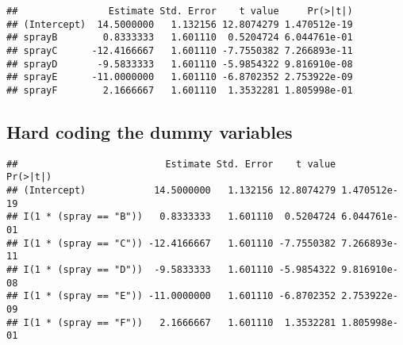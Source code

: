 \documentclass[12pt,openright,oneside,a4paper,chapter=TITLE,section=TITLE,subsection=Title,english,french,spanish,portugues,sumario=tradicional]{04-class-files/abntex2}
\newenvironment{Shaded}{\begin{snugshade}}{\end{snugshade}}
\newcommand{\DataTypeTok}[1]{\textcolor[rgb]{0.13,0.29,0.53}{#1}}
\newcommand{\DecValTok}[1]{\textcolor[rgb]{0.00,0.00,0.81}{#1}}
\newcommand{\KeywordTok}[1]{\textcolor[rgb]{0.13,0.29,0.53}{\textbf{#1}}}
\newcommand{\NormalTok}[1]{#1}
\newcommand{\OperatorTok}[1]{\textcolor[rgb]{0.81,0.36,0.00}{\textbf{#1}}}
\newcommand{\StringTok}[1]{\textcolor[rgb]{0.31,0.60,0.02}{#1}}
\begin{document}
\begin{verbatim}
##                Estimate Std. Error    t value     Pr(>|t|)
## (Intercept)  14.5000000   1.132156 12.8074279 1.470512e-19
## sprayB        0.8333333   1.601110  0.5204724 6.044761e-01
## sprayC      -12.4166667   1.601110 -7.7550382 7.266893e-11
## sprayD       -9.5833333   1.601110 -5.9854322 9.816910e-08
## sprayE      -11.0000000   1.601110 -6.8702352 2.753922e-09
## sprayF        2.1666667   1.601110  1.3532281 1.805998e-01
\end{verbatim}

\hypertarget{hard-coding-the-dummy-variables}{%
\subsection{Hard coding the dummy variables}\label{hard-coding-the-dummy-variables}}

\begin{Shaded}
\end{Shaded}

\begin{verbatim}
##                          Estimate Std. Error    t value     Pr(>|t|)
## (Intercept)            14.5000000   1.132156 12.8074279 1.470512e-19
## I(1 * (spray == "B"))   0.8333333   1.601110  0.5204724 6.044761e-01
## I(1 * (spray == "C")) -12.4166667   1.601110 -7.7550382 7.266893e-11
## I(1 * (spray == "D"))  -9.5833333   1.601110 -5.9854322 9.816910e-08
## I(1 * (spray == "E")) -11.0000000   1.601110 -6.8702352 2.753922e-09
## I(1 * (spray == "F"))   2.1666667   1.601110  1.3532281 1.805998e-01
\end{verbatim}
\end{document}
